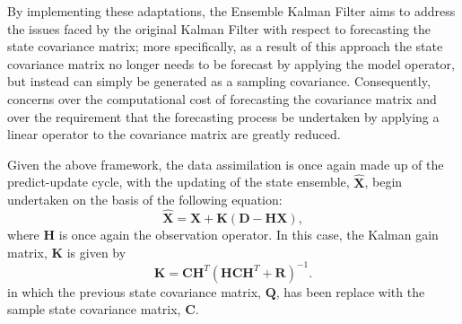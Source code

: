 By implementing these adaptations, the Ensemble Kalman Filter aims to address
the issues faced by the original Kalman Filter with respect to forecasting the
state covariance matrix; more specifically, as a result of this approach the
state covariance matrix no longer needs to be forecast by applying the model
operator, but instead can simply be generated as a sampling covariance.
Consequently, concerns over the computational cost of forecasting the covariance
matrix and over the requirement that the forecasting process be undertaken by
applying a linear operator to the covariance matrix are greatly reduced.

Given the above framework, the data assimilation is once again made up of the
predict-update cycle, with the updating of the state ensemble,
$\hat{\mathbf{X}}$, begin undertaken on the basis of the following equation: 
\begin{equation}
    \hat{\mathbf{X}} = \mathbf{X} + \mathbf{K}
                        \left(
                        \mathbf{D} - \mathbf{H} \mathbf{X}
                        \right),
\end{equation}
where $\mathbf{H}$ is once again the observation operator. 
In this case, the Kalman gain matrix, $\mathbf{K}$ is given by
\begin{equation}
    \mathbf{K} = \mathbf{C} \mathbf{H}^T
                     {\left(
                     \mathbf{H} \mathbf{C} \mathbf{H}^T
                     + \mathbf{R}
                     \right)} ^ {-1}.
\end{equation}
in which the previous state covariance matrix, $\mathbf{Q}$, has been replace
with the sample state covariance matrix, $\mathbf{C}$.

\newpage
